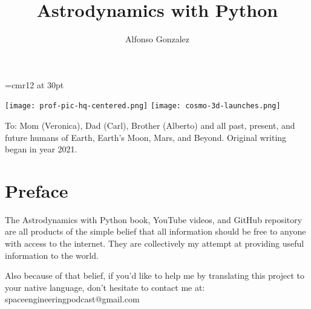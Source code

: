 \documentclass{article}
\begin{document}
\font\titlefont=cmr12 at 30pt

\color{magenta}
\Huge{\title{\vspace{-3cm}\color{magenta}\titlefont Astrodynamics with Python}}
\color{white}
\author{Alfonso Gonzalez}
\date{}
\maketitle

\begin{center}
\texttt{[image: prof-pic-hq-centered.png]}
\texttt{[image: cosmo-3d-launches.png]}
\end{center}

\newpage

\begin{center}\huge{
\color{magenta}
\hspace{-10pt}
\vfill
To: Mom (Veronica), Dad (Carl), Brother (Alberto) and all past, present, and future humans of Earth, Earth's Moon, Mars, and Beyond. Original writing began in year 2021.
\hspace{15pt}
\vfill
}
\end{center}

\newpage

\textwidth=700pt

\normalsize

\tableofcontents

\newpage

\section{Preface}

The \color{magenta}Astrodynamics with Python \color{white} book, YouTube videos, and GitHub repository are all products
of the simple belief that all information should be free to anyone with access to the internet.
They are collectively my attempt at providing useful information to the world.


Also because of that belief, if you'd like to help me by translating this project to your native language, don't hesitate
to contact me at: \color{magenta}spaceengineeringpodcast@gmail.com \color{white}
\end{document}
